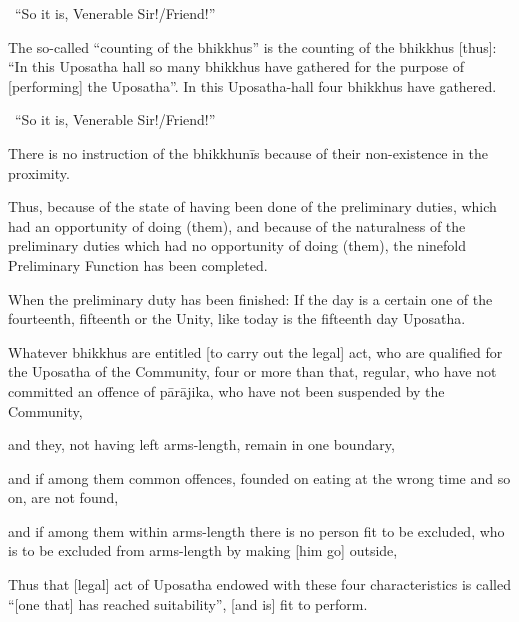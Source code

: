 \begin{center}
	\anglebracketleft\ \hspace{-0.5mm}``So it is, Venerable Sir!/Friend!'' \hspace{-0.5mm}\anglebracketright\
\end{center}

The so-called ``counting of the bhikkhus'' is the counting of the bhikkhus [thus]: ``In this Uposatha hall so many bhikkhus have gathered for the purpose of [performing] the Uposatha''. In this Uposatha-hall four bhikkhus have gathered.

\begin{center}
	\anglebracketleft\ \hspace{-0.5mm}``So it is, Venerable Sir!/Friend!'' \hspace{-0.5mm}\anglebracketright\
\end{center}

There is no instruction of the bhikkhunīs because of their non-existence in the proximity.

Thus, because of the state of having been done of the preliminary duties, which had an opportunity of doing (them), and because of the naturalness of the preliminary duties which had no opportunity of doing (them), the ninefold Preliminary Function has been completed.

When the preliminary duty has been finished: If the day is a certain one of the fourteenth, fifteenth or the Unity, like today is the fifteenth day Uposatha.

\begin{packedenumerate}
	\item Whatever bhikkhus are entitled [to carry out the legal] act, who are qualified for the Uposatha of the Community, four or more than that, regular, who have not committed an offence of pārājika, who have not been suspended by the Community,
	\item and they, not having left arms-length, remain in one boundary,
	\item and if among them common offences, founded on eating at the wrong time and so on, are not found,
	\item and if among them within arms-length there is no person fit to be excluded, who is to be excluded from arms-length by making [him go] outside,
\end{packedenumerate}

\ifninebythirteenversion\clearpage\fi

Thus that [legal] act of Uposatha endowed with these four characteristics is called ``[one that] has reached suitability'', [and is] fit to perform.

